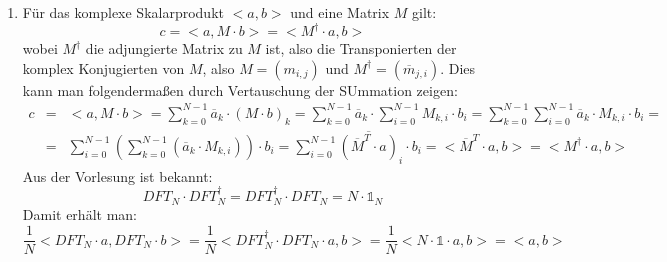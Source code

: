 \begin{enumerate}[1.]
	\item Für das komplexe Skalarprodukt $<a, b>$ und eine Matrix $M$ gilt:
	\[ c = <a, M \cdot b> = < M^\dagger \cdot a, b> \]
	wobei $M^\dagger$ die adjungierte Matrix zu $M$ ist, also die Transponierten der komplex Konjugierten von $M$,
	also $M = (m_{i,j})$ und $M^\dagger = (\overline{m}_{j,i})$.
	Dies kann man folgendermaßen durch Vertauschung der SUmmation zeigen:
	\begin{eqnarray*}
	c &=& <a, M \cdot b> = \sum_{k=0}^{N-1} \overline{a}_k \cdot \left( M \cdot b \right)_k =
	\sum_{k=0}^{N-1} \overline{a}_k \cdot \sum_{i=0}^{N-1} M_{k,i} \cdot b_i =
	\sum_{k=0}^{N-1} \sum_{i=0}^{N-1} \overline{a}_k \cdot M_{k,i} \cdot b_i = \\
	&=& \sum_{i=0}^{N-1} \left( \sum_{k=0}^{N-1} \left( \overline{a}_k \cdot M_{k,i}\right) \right) \cdot b_i =
	\sum_{i=0}^{N-1} \overline{\left( \overline{M}^T \cdot a \right)}_i \cdot b_i = <\overline{M}^T \cdot a, b> = <M^\dagger \cdot a, b>
	\end{eqnarray*}
	Aus der Vorlesung ist bekannt: 
	\[ DFT_N \cdot DFT_N^\dagger = DFT_N^\dagger \cdot DFT_N = N \cdot \mathds{1}_N \]
	Damit erhält man:
	\[ \frac{1}{N} < DFT_N \cdot a, DFT_N \cdot b> =
	\frac{1}{N} < DFT_N^\dagger \cdot DFT_N \cdot a, b > =
	\frac{1}{N} < N \cdot \mathds{1}\cdot a, b> = < a, b> \]
\end{enumerate}
